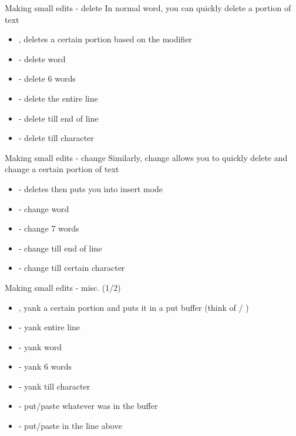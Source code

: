 \documentclass[12pt]{beamer}
\begin{document}
\begin{frame}{Making small edits - delete}
    In normal word, you can quickly delete a portion of text
    \begin{itemize}
        \item {}, deletes a certain portion based on the modifier
        \item {} - delete word
        \item {} - delete 6 words
        \item {} - delete the entire line
        \item {} - delete till end of line
        \item {} - delete till character
    \end{itemize}{}
\end{frame}{}

\begin{frame}{Making small edits - change}
    Similarly, change allows you to quickly delete and change a certain portion of text
    \begin{itemize}
        \item {} - deletes then puts you into insert mode
        \item {} - change word
        \item {} - change 7 words
        \item {} - change till end of line
        \item {} - change till certain character
    \end{itemize}{}
\end{frame}{}

\begin{frame}{Making small edits - misc. (1/2)}
    \begin{itemize}
      \item {}, yank a certain portion and puts it in a put buffer (think of / )
        \item {} - yank entire line
        \item {} - yank word
        \item {} - yank 6 words
        \item {} - yank till character
        \item {} - put/paste whatever was in the buffer
        \item {} - put/paste in the line above
    \end{itemize}{}
\end{frame}{}
\end{document}
